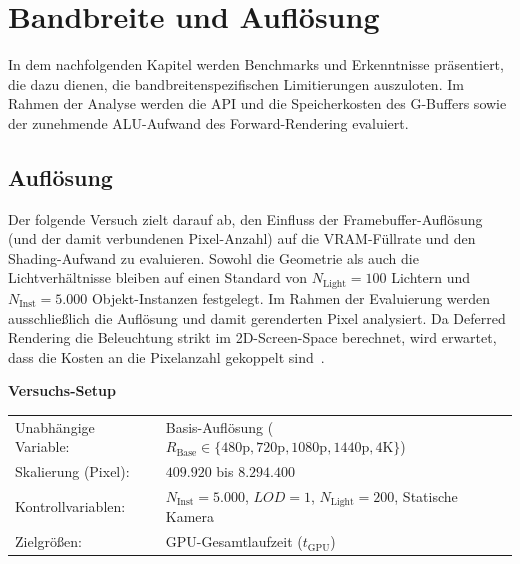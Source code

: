 \section{{Bandbreite und Auflösung}}
\label{sec:0503_brandwidth_resolution_eval}

In dem nachfolgenden Kapitel werden Benchmarks und Erkenntnisse präsentiert, die dazu dienen, die
bandbreitenspezifischen Limitierungen auszuloten.
Im Rahmen der Analyse werden die \ac{API} und die Speicherkosten des \ac{G-Buffer}s sowie der zunehmende \ac{ALU}-Aufwand des
Forward-Rendering evaluiert.

\subsection{{Auflösung}}
\label{subsec:050301_resolution_eval}

Der folgende Versuch zielt darauf ab, den Einfluss der Framebuffer-Auflösung (und der damit verbundenen Pixel-Anzahl)
auf die \ac{VRAM}-Füllrate und den Shading-Aufwand zu evaluieren.
Sowohl die Geometrie als auch die Lichtverhältnisse bleiben auf einen Standard von $N_{\text{Light}} = 100$ Lichtern und
$N_{\text{Inst}} = 5.000$ Objekt-Instanzen festgelegt.
Im Rahmen der Evaluierung werden ausschließlich die Auflösung und damit gerenderten Pixel analysiert.
Da Deferred Rendering die Beleuchtung strikt im 2D-Screen-Space berechnet, wird erwartet, dass die Kosten an die
Pixelanzahl gekoppelt sind~\cite[Abschn.~9.2]{Chapter9Deferred}.

\begin{center}
    \small
    \colorbox{gray!5}{\parbox{0.95\textwidth}{
        \centering
        \vspace{2mm}
        {\sffamily\bfseries Versuchs-Setup} \\[1.5ex]
        \begin{tabularx}{0.9\textwidth}{>{\sffamily}l X}
            Unabhängige Variable:    & Basis-Auflösung ($R_{\text{Base}} \in \{480\text{p}, 720\text{p}, 1080\text{p},
            1440\text{p}, 4\text{K}\}$) \\
            Skalierung (Pixel):      & $409.920$ bis $8.294.400$ \\
            Kontrollvariablen:       & $N_{\text{Inst}} = 5.000$, $LOD = 1$, $N_{\text{Light}} = 200$, Statische
            Kamera \\
            Zielgrößen:              & \ac{GPU}-Gesamtlaufzeit ($t_{\text{GPU}}$)
        \end{tabularx}
        \vspace{2mm}
    }}
\end{center}


